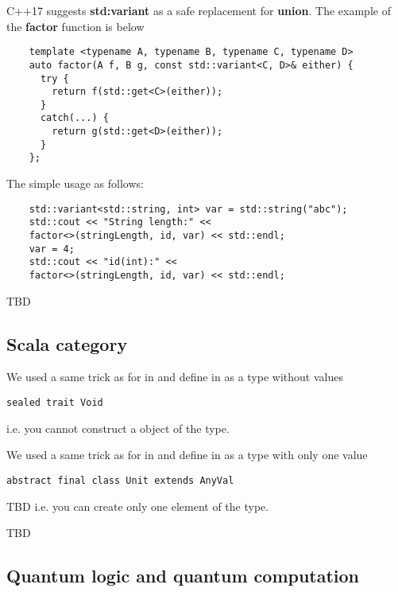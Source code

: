 \begin{example}[Sum][\textbf{C++}]
  C++17 suggests \textbf{std:variant} as a safe replacement
  for \textbf{union}. The example of the \textbf{factor}
  function is below
  \begin{verbatim}
    template <typename A, typename B, typename C, typename D>
    auto factor(A f, B g, const std::variant<C, D>& either) {
      try {
        return f(std::get<C>(either));               
      }
      catch(...) {
        return g(std::get<D>(either));                              
      }
    };
  \end{verbatim}
  The simple usage as follows:
  \begin{verbatim}
    std::variant<std::string, int> var = std::string("abc");
    std::cout << "String length:" <<
    factor<>(stringLength, id, var) << std::endl;
    var = 4;
    std::cout << "id(int):" <<
    factor<>(stringLength, id, var) << std::endl;    
  \end{verbatim}

\end{example}
TBD
\subsection{\textbf{Scala} category}
\begin{example}
\label{ex:scala_initial_object}
We used a same trick as for  in
 and define
 in  as a
type without values 
\begin{verbatim}
sealed trait Void
\end{verbatim}
i.e. you cannot construct a object of the type.
\end{example}

\begin{example}
\label{ex:scala_terminal_object}
We used a same trick as for 
in  and define
 in  as a
type with only one value
\begin{verbatim}
abstract final class Unit extends AnyVal
\end{verbatim}
TBD
i.e. you can create only one element of the type.
\end{example}

TBD

\subsection{Quantum logic and quantum computation}


